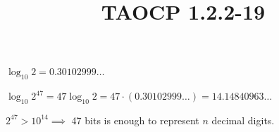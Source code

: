 \documentclass{article}
\title{TAOCP 1.2.2\mbox{-}19}
\begin{document}
\maketitle

\( \log_{10}{2} = 0.30102999\ldots \)

\( \log_{10}{2^{47}} = 47 \log_{10}{2} = 47 \cdot (0.30102999\ldots) = 14.14840963\ldots \)

\( 2^{47} > 10^{14} \implies \) 47 bits is enough to represent \( n \) decimal digits.
\end{document}
